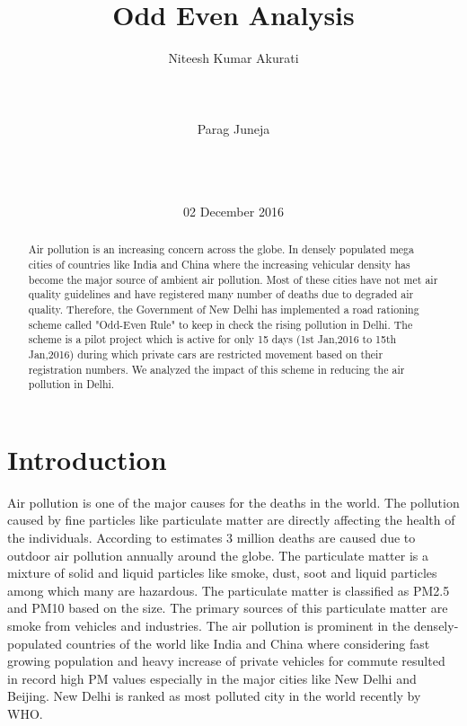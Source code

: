 \documentclass{report}
\begin{document}
\title{Odd Even Analysis}


\author{
\alignauthor
Niteesh Kumar Akurati\\
       \\
       \\
       \\
\alignauthor
Parag Juneja\\
       \\
       \\
       \\
}

\date{02 December 2016}


\maketitle
\begin{abstract}
Air pollution is an increasing concern across the globe. In densely populated mega cities of countries like India and China where the increasing vehicular density has become the major source of ambient air pollution. Most of these cities have not met air quality guidelines and have registered many number of deaths due to degraded air quality. Therefore, the Government of New Delhi has implemented a road rationing scheme called "Odd-Even Rule" to keep in check the rising pollution in Delhi. The scheme is a pilot project which is active for only 15 days (1st Jan,2016 to 15th Jan,2016) during which private cars are restricted movement based on their registration numbers. We analyzed the impact of this scheme in reducing the air pollution in Delhi.
\end{abstract}


\section{Introduction}
Air pollution is one of the major causes for the deaths in the world. The pollution caused by fine particles like particulate matter are directly affecting the health of the individuals. According to estimates 3 million deaths are caused due to outdoor air pollution annually around the globe. The particulate matter is a mixture of solid and liquid particles like smoke, dust, soot and liquid particles among which many are hazardous. The particulate matter is classified as PM2.5 and PM10 based on the size. The primary sources of this particulate matter are smoke from vehicles and industries. The air pollution is prominent in the densely-populated countries of the world like India and China where considering fast growing population and heavy increase of private vehicles for commute resulted in record high PM values especially in the major cities like New Delhi and Beijing. New Delhi is ranked as most polluted city in the world recently by WHO.
\end{document}
